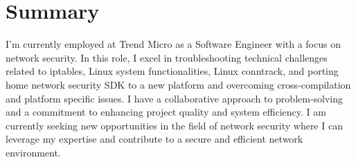 \section{Summary}
I'm currently employed at Trend Micro as a Software Engineer with a focus on network security. In this role, I excel in troubleshooting technical challenges related to iptables, Linux system functionalities, Linux conntrack, and porting home network security SDK to a new platform and overcoming cross-compilation and platform specific issues. I have a collaborative approach to problem-solving and a commitment to enhancing project quality and system efficiency. I am currently seeking new opportunities in the field of network security where I can leverage my expertise and contribute to a secure and efficient network environment.

